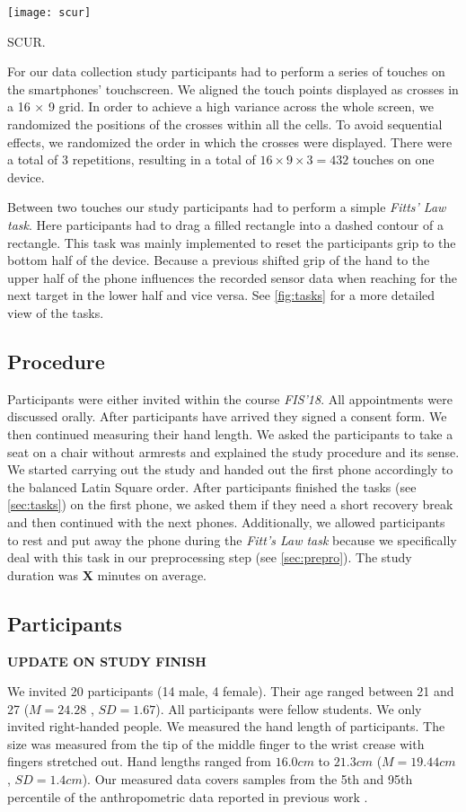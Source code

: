 \begin{marginfigure}
	\texttt{[image: scur]}
	\caption{SCUR.}
	\label{fig:tasks}
\end{marginfigure}


For our data collection study participants had to perform a series of touches on the smartphones' touchscreen. 
We aligned the touch points displayed as crosses in a 16 $ \times $ 9 grid. 
In order to achieve a high variance across the whole screen, we randomized the positions of the crosses within all the cells.
To avoid sequential effects, we randomized the order in which the crosses were displayed.
There were a total of 3 repetitions, resulting in a total  of $ 16 \times 9 \times 3 = 432 $ touches on one device.

Between two touches our study participants had to perform a simple \textit{Fitts' Law task}. 
Here participants had to drag a filled rectangle into a dashed contour of a rectangle.
This task was mainly implemented to reset the participants grip to the bottom half of the device.
Because a previous shifted grip of the hand to the upper half of the phone influences the recorded sensor data when reaching for the next target in the lower half and vice versa. 
See \cref{fig:tasks} for a more detailed view of the tasks.
\subsection{Procedure}
Participants were either invited within the course \textit{FIS'18}.
All appointments were discussed orally.
After participants have arrived they signed a consent form. 
We then continued measuring their hand length.
We asked the participants to take a seat on a chair without armrests and explained the study procedure and its sense.
We started carrying out the study and handed out the first phone accordingly to the balanced Latin Square order. 
After participants finished the tasks (see \cref{sec:tasks}) on the first phone, we asked them if they need a short recovery break and then continued with the next phones.
Additionally, we allowed participants to rest and put away the phone during the \textit{Fitt's Law task} because we specifically deal with this task in our preprocessing step (see \cref{sec:prepro}).
The study duration was \textbf{X} minutes on average.
\subsection{Participants}
\textbf{UPDATE ON STUDY FINISH}

We invited 20 participants (14 male, 4 female).
Their age ranged between 21 and 27 ($ M=24.28$ , $SD=1.67 $). 
All participants were fellow students. 
We only invited right-handed people.
We measured the hand length of participants. 
The size was measured from the tip of the middle finger to the wrist crease with fingers stretched out.
Hand lengths ranged from $16.0cm$ to $21.3cm$ ($M=19.44cm$ , $SD=1.4cm$).
Our measured data covers samples from the 5th and 95th percentile of the anthropometric data reported in previous work \cite{Poston}.  
